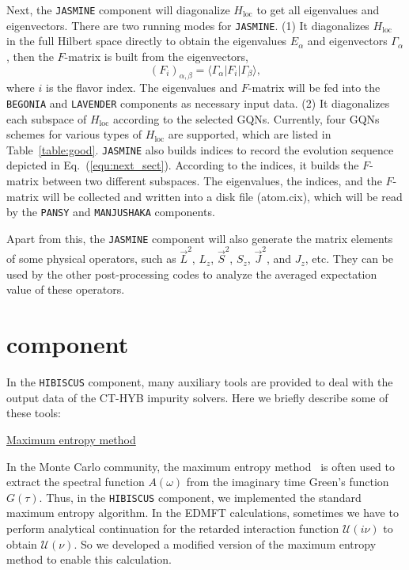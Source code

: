 Next, the \texttt{JASMINE} component will diagonalize $H_{\text{loc}}$ to get all eigenvalues and eigenvectors. There are two running modes for \texttt{JASMINE}. (1) It diagonalizes $H_{\text{loc}}$ in the full Hilbert space directly to obtain the eigenvalues $E_{\alpha}$ and eigenvectors $\Gamma_{\alpha}$, then the $F$-matrix is built from the eigenvectors,
\begin{equation}
(F_{i})_{\alpha,\beta} = \langle\Gamma_{\alpha}|F_{i}|\Gamma_{\beta}\rangle,
\end{equation}
where $i$ is the flavor index. The eigenvalues and $F$-matrix will be fed into the \texttt{BEGONIA} and \texttt{LAVENDER} components as necessary input data. (2) It diagonalizes each subspace of $H_{\text{loc}}$ according to the selected GQNs. Currently, four GQNs schemes for various types of $H_{\text{loc}}$ are supported, which are listed in Table~\ref{table:good}. \texttt{JASMINE} also builds indices to record the evolution sequence depicted in Eq.~(\ref{equ:next_sect}). According to the indices, it builds the $F$-matrix between two different subspaces. The eigenvalues, the indices, and the $F$-matrix will be collected and written into a disk file (atom.cix), which will be read by the \texttt{PANSY} and \texttt{MANJUSHAKA} components.

Apart from this, the \texttt{JASMINE} component will also generate the matrix elements of some physical operators, such as $\vec{L}^2$, $L_{z}$, $\vec{S}^2$, $S_{z}$, $\vec{J}^2$, and $J_{z}$, etc. They can be used by the other post-processing codes to analyze the averaged expectation value of these operators.

\section{{\hibiscus} component}
In the \texttt{HIBISCUS} component, many auxiliary tools are provided to deal with the output data of the CT-HYB impurity solvers. Here we briefly describe some of these tools:

\underline{Maximum entropy method}

In the Monte Carlo community, the maximum entropy method~\cite{mem:1996} is often used to extract the spectral function $A(\omega)$ from the imaginary time Green's function $G(\tau)$. Thus, in the \texttt{HIBISCUS} component, we implemented the standard maximum entropy algorithm. In the EDMFT calculations, sometimes we have to perform analytical continuation for the retarded interaction function $\mathcal{U}(i\nu)$ to obtain $\mathcal{U}(\nu)$. So we developed a modified version of the maximum entropy method to enable this calculation.

